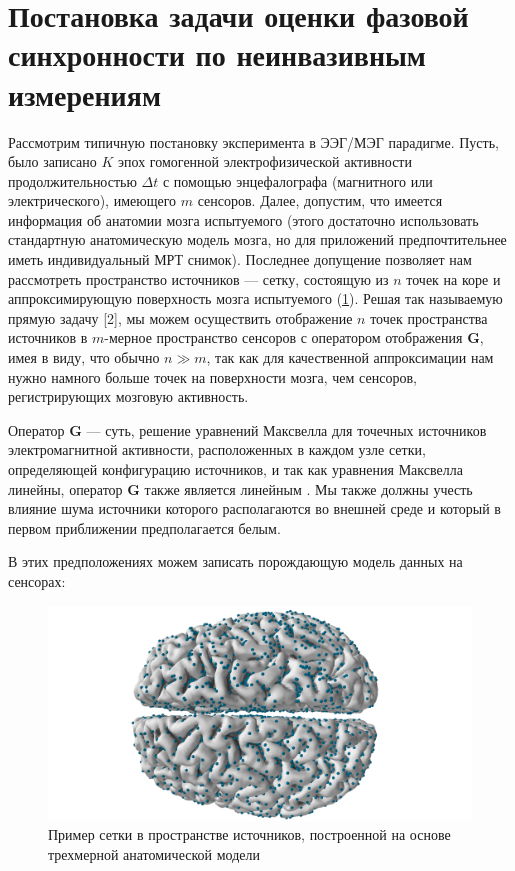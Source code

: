 \section{Постановка задачи оценки фазовой синхронности по неинвазивным измерениям}\label{sect1_1}


Рассмотрим типичную постановку эксперимента в ЭЭГ/МЭГ парадигме.
Пусть, было записано $K$ эпох гомогенной электрофизической
активности продолжительностью $\Delta t$ с помощью энцефалографа (магнитного или электрического),
имеющего $m$ сенсоров.
Далее, допустим, что имеется информация об анатомии мозга испытуемого (этого достаточно
использовать стандартную анатомическую модель мозга,
но для приложений предпочтительнее иметь индивидуальный МРТ снимок).
Последнее допущение позволяет нам рассмотреть пространство источников --- сетку,
состоящую из $n$ точек на коре и аппроксимирующую поверхность мозга испытуемого (\ref{fig:src_space}).
Решая так называемую прямую задачу [2], мы можем осуществить отображение $n$ точек пространства
источников в $m$-мерное пространство сенсоров с оператором отображения $\mathbf{G}$, имея в виду, что
обычно $n \gg m$, так как для качественной аппроксимации нам нужно намного
больше точек на поверхности мозга, чем сенсоров, регистрирующих мозговую активность.

Оператор $\mathbf{G}$ --- суть, решение уравнений Максвелла для точечных источников электромагнитной активности,
расположенных в каждом узле сетки, определяющей конфигурацию источников,
и так как уравнения Максвелла линейны, оператор $\mathbf{G}$ также является линейным \cite{Hamalainen1993}.
Мы также должны учесть влияние шума источники которого располагаются во внешней среде
и который в первом приближении предполагается белым.

В этих предположениях можем записать порождающую модель данных на сенсорах:

\begin{figure}
\centering
\includegraphics[scale=0.3]{../images/brain.png}
\caption{Пример сетки в пространстве источников,
          построенной на основе трехмерной анатомической модели}
\label{fig:src_space}
\end{figure}

